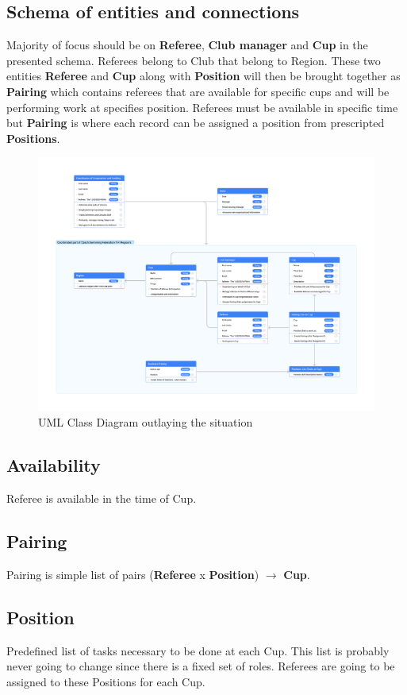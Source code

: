 \subsection*{Schema of entities and connections}
Majority of focus should be on \textbf{Referee}, \textbf{Club manager} and \textbf{Cup} in the presented schema. Referees belong to Club that belong to Region. These two entities \textbf{Referee} and \textbf{Cup} along with \textbf{Position} will then be brought together as \textbf{Pairing} which contains referees that are available for specific cups and will be performing work at specifies position. Referees must be available in specific time but \textbf{Pairing} is where each record can be assigned a position from prescripted \textbf{Positions}.
\newline
\begin{figure}[h]
\includegraphics[scale=0.160]{img/swimmpair_uml.png}
  \caption{UML Class Diagram outlaying the situation}
  \label{fig1.2:uml}
\end{figure}
\subsection*{Availability}
Referee is available in the time of Cup.
\subsection*{Pairing}
Pairing is simple list of pairs (\textbf{Referee} x \textbf{Position}) $\rightarrow$ \textbf{Cup}.
\subsection*{Position}
Predefined list of tasks necessary to be done at each Cup. This list is probably never going to change since there is a fixed set of roles. Referees are going to be assigned to these Positions for each Cup.
\newpage
